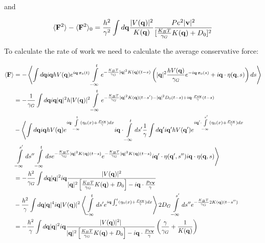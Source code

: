 \documentclass[amsmath,preprintnumbers,10pt,article,notitlepage]{revtex4-1}
\begin{document}
and

\begin{equation}
\langle {\bf F}^2 \rangle - \langle {\bf F}^2 \rangle_0 = \dfrac{h^2}{\gamma^2} \int d{\bf q} \dfrac{|V({\bf q})|^2}{K({\bf q})} \dfrac{Pe^2 |{\bf v}|^2}{ [\frac{K_BT}{\gamma_G} K({\bf q}) + D_0 ]^2} 
\label{eq:FDTviolation}
\end{equation}

To calculate the rate of work we need to calculate the average conservative force:

\begin{align}
\langle {\bf F} \rangle & = - \left \langle  \int d{\bf q} i{\bf q} h V({\bf q}) e^{i{\bf q} \cdot {\bf r}_0(t)} \int\limits_{-\infty}^t e^{-\frac{K_BT}{\gamma_G} |{\bf q}|^2 K({\bf q})(t-s)} \left( |{\bf q}|^2 \dfrac{h V({\bf q})}{\gamma_G} e^{-i{\bf q} \cdot {\bf r}_0(s)} +  i{\bf q} \cdot \eta({\bf q}, s)\right)ds  \right \rangle \\
& =   - \dfrac{1}{\gamma_G} \int d{\bf q} i{\bf q} |{\bf q}|^2 h |V({\bf q})|^2 \int\limits_{-\infty}^t e^{-\frac{K_BT}{\gamma_G} |{\bf q}|^2 K({\bf q})(t-s') - |{\bf q}|^2 D_0(t-s) + i{\bf q} \cdot  \frac{Pe{\bf v}}{\gamma}(t-s)} \\
& - \left \langle \int d{\bf q} i{\bf q} h V({\bf q}) e^{i{\bf q} \cdot \int\limits_{-\infty}^{t} ( \eta_0(x) +  \frac{Pe{\bf v}}{\gamma} ) dx} i{\bf q} \cdot \int\limits_{-\infty}^{t} ds' \dfrac{1}{\gamma} \int d{\bf q'} i{\bf q}' h V({\bf q}') e^{i{\bf q}' \cdot \int\limits_{-\infty}^{s'} (\eta_0(x) +  \frac{Pe{\bf v}}{\gamma}) dx} \right. \\ 
& \left. \int\limits_{-\infty}^{s'} ds''  \int\limits_{-\infty}^{t} ds e^{-\frac{K_BT}{\gamma_G}|{\bf q}|^2 K({\bf q})(t-s)}    e^{-\frac{K_BT}{\gamma_G}|{\bf q}|^2 K({\bf q})(t-s)}i{\bf q}' \cdot \eta({\bf q}', s'') i{\bf q} \cdot \eta({\bf q}, s)   \right \rangle \\
& = - \dfrac{h^2}{\gamma_G} \int d{\bf q} |{\bf q}|^2 i{\bf q} \dfrac{|V({\bf q})|^2}{|{\bf q}|^2 \left[\frac{K_BT}{\gamma_G} K({\bf q}) + D_0 \right] - i{\bf q} \cdot  \frac{Pe{\bf v}}{\gamma}} \\
& - \dfrac{h^2}{\gamma}\int d{\bf q} |{\bf q}|^4 i{\bf q} |V({\bf q})|^2 \left \langle \int\limits_{-\infty}^{t} ds' e^{i{\bf q}\int_s^t (\eta_0(x) +  \frac{Pe{\bf v}}{\gamma}) dx} \right \rangle 2D_G \int\limits_{-\infty}^{s'} ds''  e^{-\frac{K_BT}{\gamma_G} 2K({\bf q})(t-s'') }\\
& = - \dfrac{h^2}{\gamma}  \int d{\bf q} |{\bf q}|^2  i{\bf q} \dfrac{|V({\bf q})|^2|}{|{\bf q}|^2 \left[\frac{K_BT}{\gamma_G} K({\bf q}) + D_0 \right] - i{\bf q} \cdot  \frac{Pe{\bf v}}{\gamma}} \left( \dfrac{\gamma}{\gamma_G} + \dfrac{1}{K({\bf q})} \right) \\

\end{align}
\end{document}

